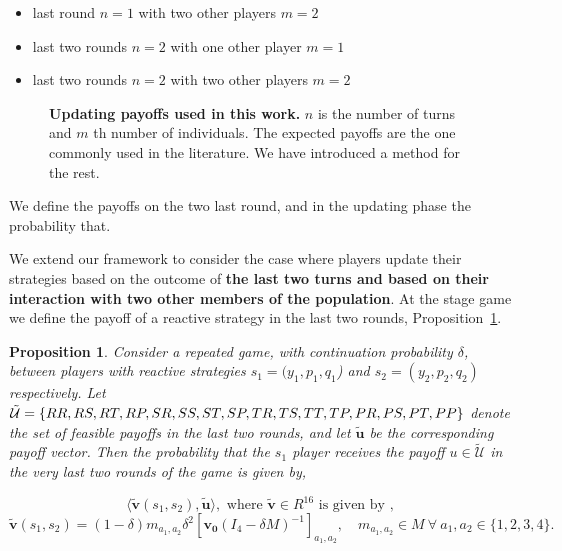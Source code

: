 \documentclass[11pt]{article}
\newcommand{\splitatcommas}[1]{%
  \begingroup
  \begingroup\lccode`~=`, \lowercase{\endgroup \edef~{\mathchar\the\mathcode`,
    \penalty0 \noexpand\hspace{0pt plus 1em}}%
  }\mathcode`,="8000 #1%
  \endgroup
}
\theoremstyle{plainCl1}
\newtheorem{Prop}{Proposition}
\theoremstyle{plainCl2}
\begin{document}
\begin{itemize}
  \item last round \(n=1\) with two other players \(m=2\)
  \item last two rounds \(n=2\) with one other player  \(m=1\)
  \item last two rounds \(n=2\) with two other players \(m=2\)
\end{itemize}

\begin{figure}[!htbp]
  \centering
  
  \caption{\textbf{Updating payoffs used in this work.} \(n\) is the
  number of turns and \(m\) th number of individuals. The expected payoffs
  are the one commonly used in the literature. We have introduced a method
  for the rest.}\label{fig:cases_updating_payoffs}
\end{figure}

We define the payoffs on the two last round, and in the updating phase the
probability that.

We extend our framework to consider the case where players update their
strategies based on the outcome of \textbf{the last two turns and based on their
interaction with two other members of the population}. At the stage game we
define the payoff of a reactive strategy in the last two rounds,
Proposition~\ref{proposition:last_two_rounds}.

\begin{Prop}\label{proposition:last_two_rounds} Consider a repeated game, with
  continuation probability $\delta$, between players with reactive strategies
  $s_1\!=\!(y_1, p_1, q_1$)  and $s_2\!=\!(y_2,p_2,q_2)$ respectively. Let
  $\mathcal{\tilde{U}} = \splitatcommas{\{RR, RS, RT, RP, SR, SS, ST, SP, TR,
  TS, TT, TP, PR, PS, PT, PP\}}$ denote the set of feasible payoffs in the last
  two rounds, and let \(\tilde{\mathbf{u}}\) be the corresponding payoff vector.
  Then the probability that the $s_1$ player receives the payoff $u\!\in\!
  \mathcal{\tilde{U}}$ in the very last two rounds of the game is given by,

  \begin{equation}
  \langle\mathbf{\tilde{v}}(s_1,s_2),\mathbf{\tilde{u}}\rangle, \text{ where } \mathbf{\tilde{v}} \in R^{16} \text{ is given by },
  \end{equation}
  \begin{equation}
    \mathbf{\tilde{v}}(s_1,s_2) = (1 - \delta) m_{a_1, a_2} \delta^2 \left[\mathbf{v_0}(I_4 - \delta M)^{-1}\right]_{a_1, a_2}, \quad  m_{a_1, a_2} \in M \ \forall \ a_1, a_2 \in \{1, 2, 3, 4\}.
  \end{equation}
\end{Prop}
\end{document}
